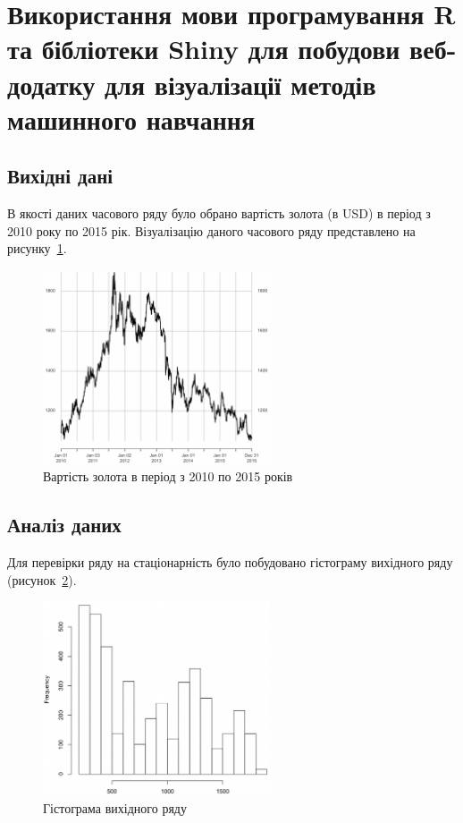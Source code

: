



\newcommand{\labnumber}{1} %



\graphicspath{{figures/}}


\Ukrainian


\addtocounter{page}{1}

\section{Використання мови програмування R та бібліотеки Shiny для побудови веб-додатку для візуалізації методів машинного навчання}
\subsection{Вихідні дані}
В якості даних часового ряду було обрано вартість золота (в USD) в період з 2010 року по 2015 рік. 
Візуалізацію даного часового ряду представлено на рисунку~\ref{fig:data}.

\begin{figure}[H]
    \centering
        \includegraphics[width=0.6\textwidth]{data}
    \caption{Вартість золота в період з 2010 по 2015 років}
    \label{fig:data}
\end{figure}

\subsection{Аналіз даних}
Для перевірки ряду на стаціонарність було побудовано гістограму вихідного ряду (рисунок~\ref{fig:hist}).

\begin{figure}[H]
    \centering
        \includegraphics[width=0.6\textwidth]{hist}
    \caption{Гістограма вихідного ряду}
    \label{fig:hist}
\end{figure}

